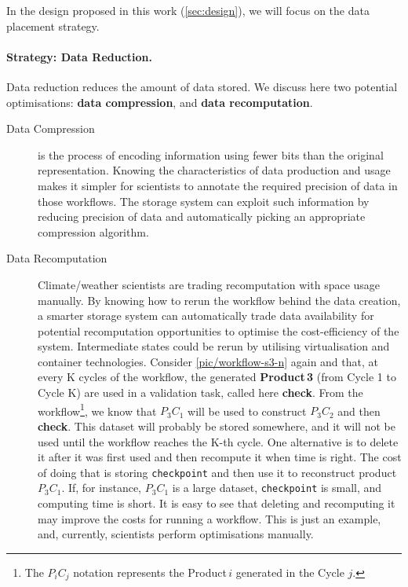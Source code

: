 \documentclass{superfri}
\newcommand{\lr}[1]{\textcolor{cyan}{LR: #1}}
\begin{document}
In the design proposed in this work (\cref{sec:design}), we will focus on the data placement strategy.

\paragraph{Strategy: Data Reduction.}

Data reduction reduces the amount of data stored.
We discuss here two potential optimisations: \textbf{data compression}, and \textbf{data recomputation}.

\begin{description}

\item[Data Compression] is the process of encoding information using fewer bits than the original representation.
Knowing the characteristics of data production and usage makes it simpler for scientists to annotate the required precision of data in those workflows.
The storage system can exploit such information by reducing precision of data and automatically picking an appropriate compression algorithm.


\item[Data Recomputation] Climate/weather scientists are trading recomputation with space usage manually.%
By knowing how to rerun the workflow behind the data creation, a smarter storage system can automatically trade data availability for potential recomputation opportunities to optimise the cost-efficiency of the system.
Intermediate states could be rerun by utilising virtualisation and container technologies.
Consider \cref{pic/workflow-s3-n} again and that, at every K cycles of the workflow, the generated \textbf{Product\,3} (from Cycle 1 to Cycle K) are used in a validation task, called here \textbf{check}.
From the workflow\footnote{The $P_i C_j$ notation represents the Product\,$i$ generated in the Cycle $j$.}, we know that $P_3 C_1$ will be used to construct $P_3 C_2$ and then \textbf{check}.
This dataset will probably be stored somewhere, and it will not be used until the workflow reaches the K-th cycle.
One alternative is to delete it after it was first used and then recompute it when time is right.
The cost of doing that is storing \texttt{checkpoint} and then use it to reconstruct product $P_3 C_1$.
If, for instance, $P_3 C_1$ is a large dataset, \texttt{checkpoint} is small, and computing time is short.
It is easy to see that deleting and recomputing it may improve the costs for running a workflow.
This is just an example, and, currently, scientists perform optimisations manually.
\end{description}
\end{document}
